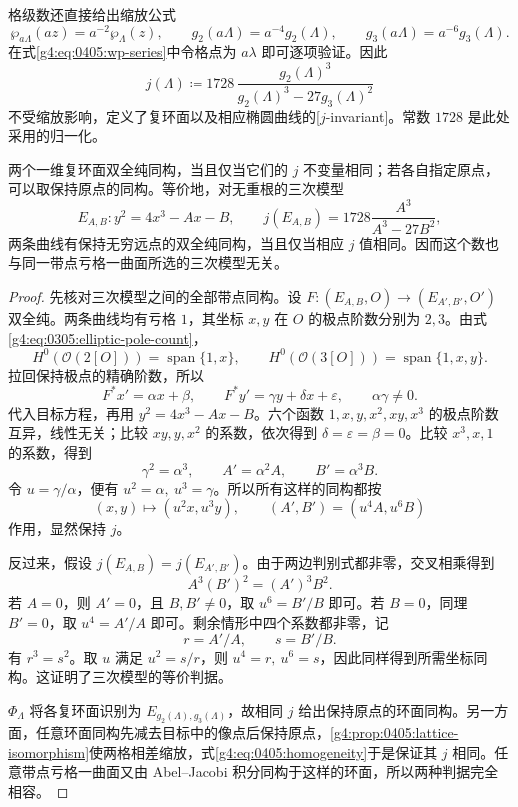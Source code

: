 \ProseParagraphBreak

格级数还直接给出缩放公式
\begin{equation}\label{g4:eq:0405:homogeneity}
	\wp_{a\Lambda}(az)=a^{-2}\wp_\Lambda(z),\qquad
	g_2(a\Lambda)=a^{-4}g_2(\Lambda),\qquad
	g_3(a\Lambda)=a^{-6}g_3(\Lambda).
\end{equation}
在式\eqref{g4:eq:0405:wp-series}中令格点为 \(a\lambda\) 即可逐项验证。因此
\begin{equation}\label{g4:eq:0405:j}
	j(\Lambda)\coloneqq
	1728\,\frac{g_2(\Lambda)^3}{g_2(\Lambda)^3-27g_3(\Lambda)^2}
\end{equation}
不受缩放影响，定义了复环面以及相应椭圆曲线的[\(j\)-invariant]。常数 \(1728\) 是此处采用的归一化。

\begin{theorem}\label{g4:thm:0405:j-classification}
	两个一维复环面双全纯同构，当且仅当它们的 \(j\) 不变量相同；若各自指定原点，可以取保持原点的同构。等价地，对无重根的三次模型
	\[
		E_{A,B}:y^2=4x^3-Ax-B,\qquad
		j(E_{A,B})=1728\frac{A^3}{A^3-27B^2},
	\]
	两条曲线有保持无穷远点的双全纯同构，当且仅当相应 \(j\) 值相同。因而这个数也与同一带点亏格一曲面所选的三次模型无关。
\end{theorem}
\begin{proof}
	先核对三次模型之间的全部带点同构。设
	\(F:(E_{A,B},O)\to(E_{A',B'},O')\) 双全纯。两条曲线均有亏格 \(1\)，其坐标 \(x,y\) 在 \(O\) 的极点阶数分别为 \(2,3\)。由式\eqref{g4:eq:0305:elliptic-pole-count}，
	\[
		H^0(\mathcal O(2[O]))=\operatorname{span}\{1,x\},\qquad
		H^0(\mathcal O(3[O]))=\operatorname{span}\{1,x,y\}.
	\]
	拉回保持极点的精确阶数，所以
	\[
		F^*x'=\alpha x+\beta,\qquad
		F^*y'=\gamma y+\delta x+\varepsilon,\qquad
		\alpha\gamma\ne0.
	\]
	代入目标方程，再用 \(y^2=4x^3-Ax-B\)。六个函数
	\(1,x,y,x^2,xy,x^3\) 的极点阶数互异，线性无关；比较 \(xy,y,x^2\) 的系数，依次得到
	\(\delta=\varepsilon=\beta=0\)。比较 \(x^3,x,1\) 的系数，得到
	\[
		\gamma^2=\alpha^3,\qquad
		A'=\alpha^2 A,\qquad B'=\alpha^3 B.
	\]
	令 \(u=\gamma/\alpha\)，便有 \(u^2=\alpha,\ u^3=\gamma\)。所以所有这样的同构都按
	\[
		(x,y)\longmapsto(u^2x,u^3y),\qquad
		(A',B')=(u^4A,u^6B)
	\]
	作用，显然保持 \(j\)。

	反过来，假设 \(j(E_{A,B})=j(E_{A',B'})\)。由于两边判别式都非零，交叉相乘得到
	\[
		A^3(B')^2=(A')^3B^2.
	\]
	若 \(A=0\)，则 \(A'=0\)，且 \(B,B'\ne0\)，取 \(u^6=B'/B\) 即可。若 \(B=0\)，同理 \(B'=0\)，取 \(u^4=A'/A\) 即可。剩余情形中四个系数都非零，记
	\[
		r=A'/A,\qquad s=B'/B.
	\]
	有 \(r^3=s^2\)。取 \(u\) 满足 \(u^2=s/r\)，则 \(u^4=r,\ u^6=s\)，因此同样得到所需坐标同构。这证明了三次模型的等价判据。

	\(\Phi_\Lambda\) 将各复环面识别为 \(E_{g_2(\Lambda),g_3(\Lambda)}\)，故相同 \(j\) 给出保持原点的环面同构。另一方面，任意环面同构先减去目标中的像点后保持原点，\cref{g4:prop:0405:lattice-isomorphism}使两格相差缩放，式\eqref{g4:eq:0405:homogeneity}于是保证其 \(j\) 相同。任意带点亏格一曲面又由 Abel--Jacobi 积分同构于这样的环面，所以两种判据完全相容。
\end{proof}

